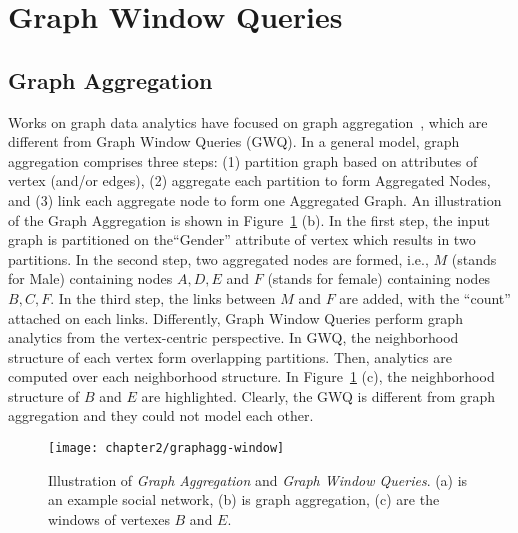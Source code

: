 \section{Graph Window Queries}

\subsection{Graph Aggregation}
Works on graph data analytics have focused  on graph aggregation~\cite{zhao2011graph,wang2014pagrol,chen2008graph,tian2008efficient},
which are different from Graph Window Queries (GWQ).
In a general model, graph aggregation comprises three steps: (1) partition
graph based on attributes of vertex (and/or edges), (2) aggregate each
partition to form Aggregated Nodes, and (3) link each aggregate node to
form one Aggregated Graph. An illustration of the Graph Aggregation is shown 
in Figure~\ref{fig:rw-agg-window} (b). In the first step, the input graph
is partitioned on the``Gender'' attribute of vertex which results in two partitions. In the second
step, two aggregated nodes are formed, i.e., $M$ (stands for Male) containing nodes $A,D,E$
and $F$ (stands for female) containing nodes $B,C,F$. In the third step, the links between 
$M$ and $F$ are added, with the ``count'' attached on each links. 
Differently, Graph Window Queries perform graph analytics from the vertex-centric perspective.
In GWQ, the neighborhood structure of each vertex form overlapping partitions. Then,
analytics are computed over each neighborhood structure. In
Figure~\ref{fig:rw-agg-window} (c), the neighborhood structure of $B$ and $E$
are highlighted. Clearly, the GWQ is different from graph aggregation
and they could not model each other.
%

\begin{figure}[h]
\centering
\texttt{[image: chapter2/graphagg-window]}
\caption{Illustration of \emph{Graph Aggregation} and \emph{Graph Window Queries}. (a) is an example social network, (b) is graph aggregation, (c) are the windows of vertexes $B$ and $E$.}
\label{fig:rw-agg-window}
\end{figure}



